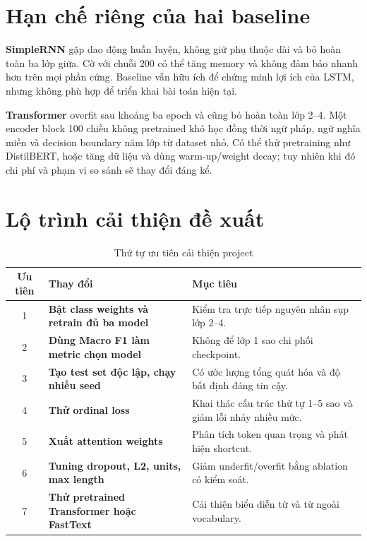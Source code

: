 \documentclass[12pt]{report}
\newcommand{\codeword}[1]{\texttt{\detokenize{#1}}}
\begin{document}
\section{Hạn chế riêng của hai baseline}

\textbf{SimpleRNN} gặp dao động huấn luyện, không giữ phụ thuộc dài và bỏ hoàn
toàn ba lớp giữa. Cờ \codeword{unroll=True} với chuỗi 200 có thể tăng memory và
không đảm bảo nhanh hơn trên mọi phần cứng. Baseline vẫn hữu ích để chứng minh
lợi ích của LSTM, nhưng không phù hợp để triển khai bài toán hiện tại.

\textbf{Transformer} overfit sau khoảng ba epoch và cũng bỏ hoàn toàn lớp 2--4.
Một encoder block 100 chiều không pretrained khó học đồng thời ngữ pháp, ngữ
nghĩa miền và decision boundary năm lớp từ dataset nhỏ. Có thể thử pretraining
như DistilBERT, hoặc tăng dữ liệu và dùng warm-up/weight decay; tuy nhiên khi đó
chi phí và phạm vi so sánh sẽ thay đổi đáng kể.

\section{Lộ trình cải thiện đề xuất}

\begin{table}[H]
\centering
\caption{Thứ tự ưu tiên cải thiện project}
\label{tab:roadmap}
\begin{tabularx}{\linewidth}{c >{\bfseries}l X}
\toprule
\textbf{Ưu tiên} & \textbf{Thay đổi} & \textbf{Mục tiêu} \\
\midrule
1 & Bật class weights và retrain đủ ba model &
Kiểm tra trực tiếp nguyên nhân sụp lớp 2--4. \\
2 & Dùng Macro F1 làm metric chọn model &
Không để lớp 1 sao chi phối checkpoint. \\
3 & Tạo test set độc lập, chạy nhiều seed &
Có ước lượng tổng quát hóa và độ bất định đáng tin cậy. \\
4 & Thử ordinal loss &
Khai thác cấu trúc thứ tự 1--5 sao và giảm lỗi nhảy nhiều mức. \\
5 & Xuất attention weights &
Phân tích token quan trọng và phát hiện shortcut. \\
6 & Tuning dropout, L2, units, max length &
Giảm underfit/overfit bằng ablation có kiểm soát. \\
7 & Thử pretrained Transformer hoặc FastText &
Cải thiện biểu diễn từ và từ ngoài vocabulary. \\
\bottomrule
\end{tabularx}
\end{table}
\end{document}
